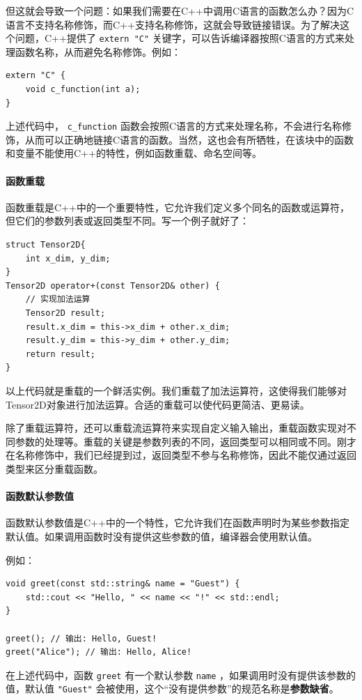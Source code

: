 但这就会导致一个问题：如果我们需要在C++中调用C语言的函数怎么办？因为C语言不支持名称修饰，而C++支持名称修饰，这就会导致链接错误。为了解决这个问题，C++提供了 \texttt{extern "C"} 关键字，可以告诉编译器按照C语言的方式来处理函数名称，从而避免名称修饰。例如：
\begin{verbatim}
extern "C" {
    void c_function(int a);
}
\end{verbatim}
上述代码中， \texttt{c\_function} 函数会按照C语言的方式来处理名称，不会进行名称修饰，从而可以正确地链接C语言的函数。当然，这也会有所牺牲，在该块中的函数和变量不能使用C++的特性，例如函数重载、命名空间等。

\paragraph{函数重载}

函数重载是C++中的一个重要特性，它允许我们定义多个同名的函数或运算符，但它们的参数列表或返回类型不同。写一个例子就好了：

\begin{verbatim}
struct Tensor2D{
    int x_dim, y_dim;
}
Tensor2D operator+(const Tensor2D& other) {
    // 实现加法运算
    Tensor2D result;
    result.x_dim = this->x_dim + other.x_dim;
    result.y_dim = this->y_dim + other.y_dim;
    return result;
}
\end{verbatim}
以上代码就是重载的一个鲜活实例。我们重载了加法运算符，这使得我们能够对Tensor2D对象进行加法运算。合适的重载可以使代码更简洁、更易读。

除了重载运算符，还可以重载流运算符来实现自定义输入输出，重载函数实现对不同参数的处理等。重载的关键是参数列表的不同，返回类型可以相同或不同。刚才在名称修饰中，我们已经提到过，返回类型不参与名称修饰，因此不能仅通过返回类型来区分重载函数。

\paragraph{函数默认参数值}

函数默认参数值是C++中的一个特性，它允许我们在函数声明时为某些参数指定默认值。如果调用函数时没有提供这些参数的值，编译器会使用默认值。

例如：
\begin{verbatim}
void greet(const std::string& name = "Guest") {
    std::cout << "Hello, " << name << "!" << std::endl;
}

greet(); // 输出: Hello, Guest!
greet("Alice"); // 输出: Hello, Alice!
\end{verbatim}
在上述代码中，函数 \texttt{greet} 有一个默认参数 \texttt{name} ，如果调用时没有提供该参数的值，默认值 \texttt{"Guest"} 会被使用，这个“没有提供参数”的规范名称是\textbf{参数缺省}。

